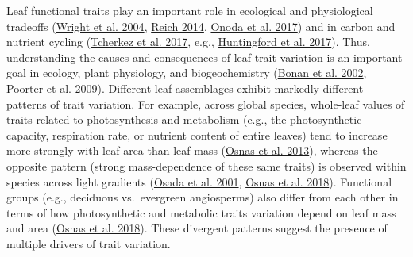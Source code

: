\documentclass[
  12pt,
  letterpaper,
  DIV=11,
  numbers=noendperiod]{scrartcl}
\begin{document}
Leaf functional traits play an important role in ecological and
physiological tradeoffs (\protect\hyperlink{ref-Wright2004a}{Wright et
al. 2004}, \protect\hyperlink{ref-Reich2014}{Reich 2014},
\protect\hyperlink{ref-Onoda2017}{Onoda et al. 2017}) and in carbon and
nutrient cycling (\protect\hyperlink{ref-Tcherkez2017}{Tcherkez et al.
2017}, e.g., \protect\hyperlink{ref-Huntingford2017}{Huntingford et al.
2017}). Thus, understanding the causes and consequences of leaf trait
variation is an important goal in ecology, plant physiology, and
biogeochemistry (\protect\hyperlink{ref-Bonan2002}{Bonan et al. 2002},
\protect\hyperlink{ref-Poorter2009}{Poorter et al. 2009}). Different
leaf assemblages exhibit markedly different patterns of trait variation.
For example, across global species, whole-leaf values of traits related
to photosynthesis and metabolism (e.g., the photosynthetic capacity,
respiration rate, or nutrient content of entire leaves) tend to increase
more strongly with leaf area than leaf mass
(\protect\hyperlink{ref-Osnas2013}{Osnas et al. 2013}), whereas the
opposite pattern (strong mass-dependence of these same traits) is
observed within species across light gradients
(\protect\hyperlink{ref-Osada2001}{Osada et al. 2001},
\protect\hyperlink{ref-Osnas2018}{Osnas et al. 2018}). Functional groups
(e.g., deciduous vs.~evergreen angiosperms) also differ from each other
in terms of how photosynthetic and metabolic traits variation depend on
leaf mass and area (\protect\hyperlink{ref-Osnas2018}{Osnas et al.
2018}). These divergent patterns suggest the presence of multiple
drivers of trait variation.
\end{document}
